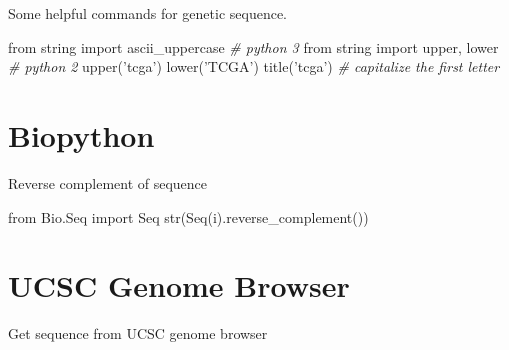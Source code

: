 \documentclass[]{book}
\newenvironment{Shaded}{\begin{snugshade}}{\end{snugshade}}
\newcommand{\BuiltInTok}[1]{#1}
\newcommand{\CommentTok}[1]{\textcolor[rgb]{0.56,0.35,0.01}{\textit{#1}}}
\newcommand{\ImportTok}[1]{#1}
\newcommand{\NormalTok}[1]{#1}
\newcommand{\OperatorTok}[1]{\textcolor[rgb]{0.81,0.36,0.00}{\textbf{#1}}}
\newcommand{\SpecialCharTok}[1]{\textcolor[rgb]{0.00,0.00,0.00}{#1}}
\newcommand{\StringTok}[1]{\textcolor[rgb]{0.31,0.60,0.02}{#1}}
\newcommand{\VariableTok}[1]{\textcolor[rgb]{0.00,0.00,0.00}{#1}}
\begin{document}
Some helpful commands for genetic sequence.

\begin{Shaded}
\begin{Highlighting}[]
\ImportTok{from}\NormalTok{ string }\ImportTok{import}\NormalTok{ ascii_uppercase }\CommentTok{# python 3}
\ImportTok{from}\NormalTok{ string }\ImportTok{import}\NormalTok{ upper, lower }\CommentTok{# python 2}
\NormalTok{upper(}\StringTok{'tcga'}\NormalTok{)}
\NormalTok{lower(}\StringTok{'TCGA'}\NormalTok{)}
\NormalTok{title(}\StringTok{'tcga'}\NormalTok{) }\CommentTok{# capitalize the first letter}
\end{Highlighting}
\end{Shaded}

\hypertarget{biopython}{%
\section{Biopython}\label{biopython}}

Reverse complement of sequence

\begin{Shaded}
\begin{Highlighting}[]
\ImportTok{from}\NormalTok{ Bio.Seq }\ImportTok{import}\NormalTok{ Seq}
\BuiltInTok{str}\NormalTok{(Seq(i).reverse_complement())}
\end{Highlighting}
\end{Shaded}

\hypertarget{ucsc-genome-browser}{%
\section{UCSC Genome Browser}\label{ucsc-genome-browser}}

Get sequence from UCSC genome browser

\begin{Shaded}
\end{Shaded}
\end{document}
